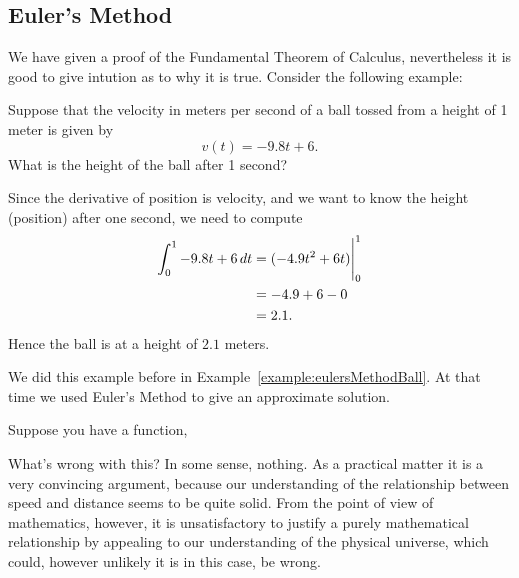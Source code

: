 \subsection*{Euler's Method}

We have given a proof of the Fundamental Theorem of Calculus,
nevertheless it is good to give intution as to why it is
true. Consider the following example:

\begin{example}
Suppose that the velocity in meters per second of a ball tossed from a
height of 1 meter is given by
\[
v(t) = -9.8t + 6.
\]
What is the height of the ball after 1 second?
\end{example}

\begin{solution}
Since the derivative of position is velocity, and we want to know the
height (position) after one second, we need to compute
\begin{align*}
\int_0^1 -9.8t + 6 \, d t &= (-4.9t^2 + 6t)\Bigg|_0^1\\
&= -4.9 + 6 - 0\\
&= 2.1.
\end{align*}
Hence the ball is at a height of $2.1$ meters. 
\end{solution}

We did this example before in
Example~\ref{example:eulersMethodBall}. At that time we used Euler's
Method to give an approximate solution.


Suppose you have a function, 



What's wrong with this? In some sense, nothing. As a practical matter
it is a very convincing argument, because our understanding of the
relationship between speed and distance seems to be quite solid. From
the point of view of mathematics, however, it is unsatisfactory to
justify a purely mathematical relationship by appealing to our
understanding of the physical universe, which could, however unlikely
it is in this case, be wrong.














